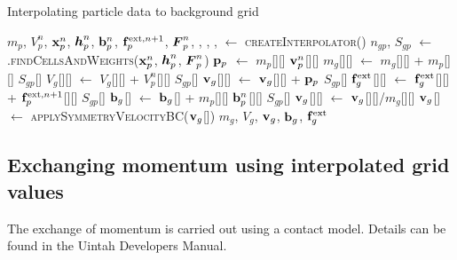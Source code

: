 \begin{breakablealgorithm}
  \caption{Interpolating particle data to background grid}
  \begin{algorithmic}[1]
    \Require $m_p$, $V_p^n$, $\mathbf{x}_p^n$, $\boldsymbol{h}_p^n$, $\mathbf{b}_p^n$, $\mathbf{f}^{\text{ext},n+1}_p$, $\boldsymbol{F}_p^n$,
             , , 
             , 
      \State {} $\leftarrow$ \textsc{createInterpolator}()
          \State $n_{gp}$, $S_{gp}$ $\leftarrow$ 
            .\textsc{findCellsAndWeights}($\mathbf{x}_p^n$, $\boldsymbol{h}_p^n$, $\boldsymbol{F}_p^n$)
          \State $\mathbf{p}_p$ $\leftarrow$ $m_p$[\TTmatl][\TTpart] $\mathbf{v}_p^n$[\TTmatl][\TTpart] 
            \State $m_g$[\TTmatl][\TTnode] $\leftarrow$ $m_g$[\TTmatl][\TTnode] + $m_p$[\TTmatl][\TTpart] $S_{gp}$[\TTnode]
            \State $V_g$[\TTmatl][\TTnode] $\leftarrow$ $V_g$[\TTmatl][\TTnode] + $V_p^n$[\TTmatl][\TTpart] $S_{gp}$[\TTnode]
            \State $\mathbf{v}_g$[\TTmatl][\TTnode] $\leftarrow$ $\mathbf{v}_g$[\TTmatl][\TTnode] + $\mathbf{p}_p$ $S_{gp}$[\TTnode]
            \State $\mathbf{f}^{\text{ext}}_g$[\TTmatl][\TTnode] $\leftarrow$ $\mathbf{f}^{\text{ext}}_g$[\TTmatl][\TTnode] + $\mathbf{f}^{\text{ext},n+1}_p$[\TTmatl][\TTpart] $S_{gp}$[\TTnode]
            \State $\mathbf{b}_g$[\TTnode] $\leftarrow$ $\mathbf{b}_g$[\TTnode] + $m_p$[\TTmatl][\TTpart] $\mathbf{b}^n_p$[\TTmatl][\TTpart] $S_{gp}$[\TTnode]
          \EndFor
        \EndFor
          \State $\mathbf{v}_g$[\TTmatl][\TTnode] $\leftarrow$ $\mathbf{v}_g$[\TTmatl][\TTnode]/$m_g$[\TTmatl][\TTnode]
        \EndFor
        \State $\mathbf{v}_g$[\TTmatl] $\leftarrow$ \textsc{applySymmetryVelocityBC}($\mathbf{v}_g$[\TTmatl])
      \EndFor
      \State \Return $m_g$, $V_g$, $\mathbf{v}_g$, $\mathbf{b}_g$, $\mathbf{f}_g^{\text{ext}}$
    \EndProcedure
  \end{algorithmic}
\end{breakablealgorithm}

\subsection{Exchanging momentum using interpolated grid values}
The exchange of momentum is carried out using a contact model.  Details can be found in the
Uintah Developers Manual.

